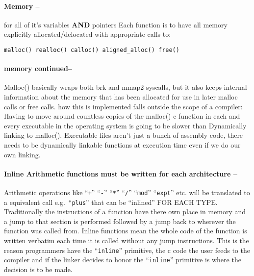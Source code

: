 \hypertarget{memory}{%
\paragraph{Memory --}\label{memory}}

for all of it's variables \textbf{AND} pointers Each function is to have
all memory explicitly allocated/delocated with appropriate calls to:

\begin{verbatim}
malloc() realloc() calloc() aligned_alloc() free()
\end{verbatim}

\hypertarget{memory-continued}{%
\paragraph{memory continued--}\label{memory-continued}}

Malloc() basically wraps both brk and mmap2 syscalls, but it also keeps
internal information about the memory that has been allocated for use in
later malloc calls or free calls. how this is implemented falls outside
the scope of a compiler: Having to move around countless copies of the
malloc() c function in each and every executable in the operating system
is going to be slower than Dynamically linking to malloc(). Executable
files aren't just a bunch of assembly code, there needs to be
dynamically linkable functions at execution time even if we do our own
linking.

\hypertarget{inline-arithmetic-functions-must-be-written-for-each-architecture}{%
\paragraph{Inline Arithmetic functions must be written for each
architecture
--}\label{inline-arithmetic-functions-must-be-written-for-each-architecture}}

Arithmetic operations like ``\texttt{+}'' ``\texttt{-}'' ``\texttt{*}''
``\texttt{/}'' ``\texttt{mod}'' ``\texttt{expt}'' etc. will be
translated to a equivalent call e.g.~``\texttt{plus}'' that can be
``inlined'' FOR EACH TYPE. Traditionally the instructions of a function
have there own place in memory and a jump to that section is performed
followed by a jump back to wherever the function was called from. Inline
functions mean the whole code of the function is written verbatim each
time it is called without any jump instructions. This is the reason
programmers have the ``\texttt{inline}'' primitive, the c code the user
feeds to the compiler and if the linker decides to honor the
``\texttt{inline}'' primitive is where the decision is to be made.

